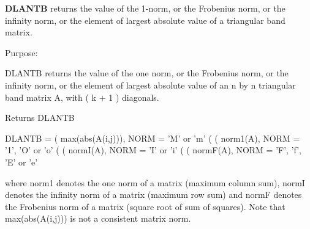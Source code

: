 {\bfseries D\+L\+A\+N\+T\+B} returns the value of the 1-\/norm, or the Frobenius norm, or the infinity norm, or the element of largest absolute value of a triangular band matrix. 

 \begin{DoxyParagraph}{Purpose\+: }
\begin{DoxyVerb} DLANTB  returns the value of the one norm,  or the Frobenius norm, or
 the  infinity norm,  or the element of  largest absolute value  of an
 n by n triangular band matrix A,  with ( k + 1 ) diagonals.\end{DoxyVerb}

\end{DoxyParagraph}
\begin{DoxyReturn}{Returns}
D\+L\+A\+N\+T\+B \begin{DoxyVerb}    DLANTB = ( max(abs(A(i,j))), NORM = 'M' or 'm'
             (
             ( norm1(A),         NORM = '1', 'O' or 'o'
             (
             ( normI(A),         NORM = 'I' or 'i'
             (
             ( normF(A),         NORM = 'F', 'f', 'E' or 'e'

 where  norm1  denotes the  one norm of a matrix (maximum column sum),
 normI  denotes the  infinity norm  of a matrix  (maximum row sum) and
 normF  denotes the  Frobenius norm of a matrix (square root of sum of
 squares).  Note that  max(abs(A(i,j)))  is not a consistent matrix norm.\end{DoxyVerb}
 
\end{DoxyReturn}

